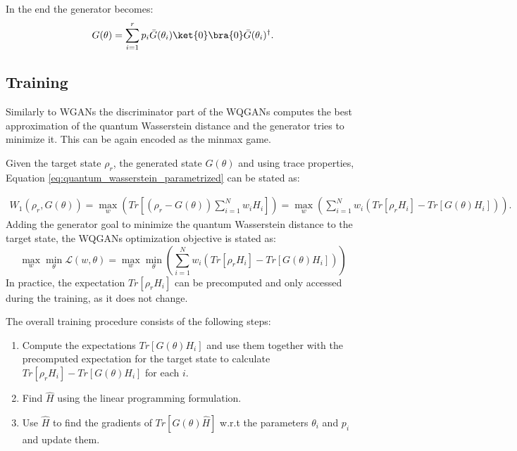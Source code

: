 In the end the generator becomes:
\begin{equation}
  G(\theta) = \sum_{i=1}^r p_i\bar{G}(\theta_i)\ket{0}\bra{0}\bar{G}(\theta_i)^\dagger.
\end{equation}



\subsection{Training}
Similarly to WGANs the discriminator part of the WQGANs computes the best
approximation of the quantum Wasserstein distance and the generator tries to
minimize it. This can be again encoded as the minmax game.

Given the target state $\rho_r$, the generated state $G(\theta)$ and using trace
properties, Equation \eqref{eq:quantum_wasserstein_parametrized} can be stated as:

\begin{equation}
  \label{eq:quantum_wasserstein_separated_trace}
  \begin{split}
    W_1(\rho_r, G(\theta)) = \max_{w}{(Tr[(\rho_r - G(\theta))\sum_{i=1}^N w_iH_i])} = \max_{w}{(\sum_{i=1}^Nw_i(Tr[\rho_rH_i] - Tr[G(\theta)H_i]))}.
  \end{split}
\end{equation}
Adding the generator goal to minimize the quantum Wasserstein distance to the target
state, the WQGANs optimization objective is stated as:
\begin{equation}
  \max_{w}{\min_{\theta}{\mathcal{L}(w, \theta)}} = \max_{w}{\min_{\theta}{(\sum_{i=1}^Nw_i(Tr[\rho_rH_i] - Tr[G(\theta)H_i]))}} 
  \label{eq:wqgans_optimization_objective}
\end{equation}
In practice, the expectation $Tr[\rho_rH_i]$ can be precomputed and only
accessed during the training, as it does not change.

The overall training procedure consists of the following steps:
\begin{enumerate}
\item Compute the expectations $Tr[G(\theta)H_i]$ and use them together with
  the precomputed expectation for the target state to calculate $Tr[\rho_rH_i] -
  Tr[G(\theta)H_i]$ for each $i$.
\item Find $\hat{H}$ using the linear programming formulation.
\item Use $\hat{H}$ to find the gradients of $Tr[G(\theta)\hat{H}]$ w.r.t the parameters
  $\theta_i$ and $p_i$ and update them.
\end{enumerate}

